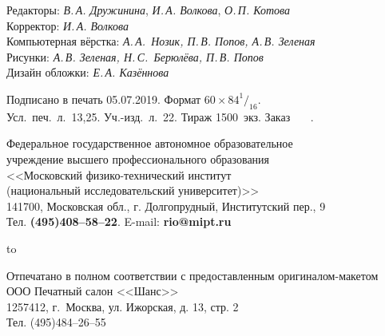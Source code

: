 {\footnotesize\raggedright

Редакторы: {\it В.\,А. Дружинина}, {\it И.\,А. Волкова}, 
{\it О.\,П. Котова}\\
Корректор: {\it И.\,А. Волкова}\\
Компьютерная вёрстка: {\it А.\,А.~Нозик, П.\,В. Попов, А.\,В. Зеленая}\\
Рисунки: {\it А.\,В. Зеленая, Н.\,С.~Берюлёва, П.\,В. Попов}\\
Дизайн обложки: {\it Е.\,А. Казённова}

\medskip

Подписано в печать 05.07.2019. Формат $60\times84^1{/}_{16}$.\\
Усл.~печ.~л.~13,25. Уч.-изд.~л.~22. Тираж 1500~экз. Заказ \textnumero~~~.

\medskip

Федеральное государственное автономное образовательное\\
учреждение высшего профессионального образования\\
<<Московский физико-технический институт\\
(национальный исследовательский университет)>>\\
141700, Московская обл., г. Долгопрудный, Институтский пер., 9\\
Тел. {\bf (495)408--58--22}. E-mail: {\bf rio@mipt.ru}

\medskip

\hfil \hbox to \textwidth{\hrulefill}\par

Отпечатано в полном соответствии с предоставленным оригиналом-макетом\\
ООО Печатный салон <<Шанс>>\\
1257412, г.~Москва, ул. Ижорская, д. 13, стр. 2\\
Тел. (495)484--26--55

}

